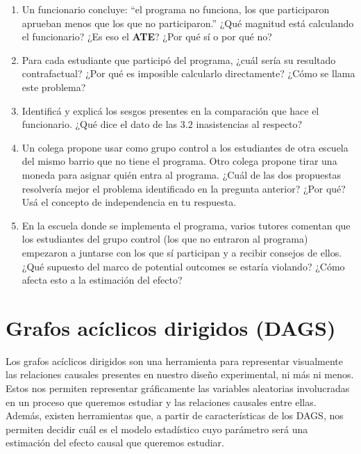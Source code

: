 \documentclass[
  letterpaper,
  DIV=11,
  numbers=noendperiod,
  oneside]{scrreprt}
\begin{document}
\begin{enumerate}
\def\labelenumi{\arabic{enumi}.}
\item
  Un funcionario concluye: ``el programa no funciona, los que
  participaron aprueban menos que los que no participaron.'' ¿Qué
  magnitud está calculando el funcionario? ¿Es eso el \textbf{ATE}? ¿Por
  qué sí o por qué no?
\item
  Para cada estudiante que participó del programa, ¿cuál sería su
  resultado contrafactual? ¿Por qué es imposible calcularlo
  directamente? ¿Cómo se llama este problema?
\item
  Identificá y explicá los sesgos presentes en la comparación que hace
  el funcionario. ¿Qué dice el dato de las \(3.2\) inasistencias al
  respecto?
\item
  Un colega propone usar como grupo control a los estudiantes de otra
  escuela del mismo barrio que no tiene el programa. Otro colega propone
  tirar una moneda para asignar quién entra al programa. ¿Cuál de las
  dos propuestas resolvería mejor el problema identificado en la
  pregunta anterior? ¿Por qué? Usá el concepto de independencia en tu
  respuesta.
\item
  En la escuela donde se implementa el programa, varios tutores comentan
  que los estudiantes del grupo control (los que no entraron al
  programa) empezaron a juntarse con los que sí participan y a recibir
  consejos de ellos. ¿Qué supuesto del marco de potential outcomes se
  estaría violando? ¿Cómo afecta esto a la estimación del efecto?
\end{enumerate}


\hypertarget{grafos-acuxedclicos-dirigidos-dags}{%
\chapter{Grafos acíclicos dirigidos
(DAGS)}\label{grafos-acuxedclicos-dirigidos-dags}}

Los grafos acíclicos dirigidos son una herramienta para
representar visualmente las relaciones causales presentes en nuestro
diseño experimental, ni más ni menos. Estos nos permiten representar
gráficamente las variables aleatorias involucradas en un proceso que
queremos estudiar y las relaciones causales entre ellas. Además, existen
herramientas que, a partir de características de los DAGS, nos permiten
decidir cuál es el modelo estadístico cuyo parámetro será una estimación
del efecto causal que queremos estudiar.
\end{document}
